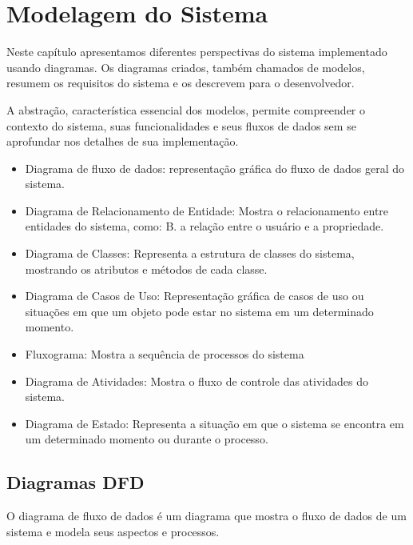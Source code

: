 
\chapter{Modelagem do Sistema}

Neste capítulo apresentamos diferentes perspectivas do sistema implementado usando diagramas. Os diagramas criados, também chamados de modelos, resumem os requisitos do sistema e os descrevem para o desenvolvedor.

A abstração, característica essencial dos modelos, permite compreender o contexto do sistema, suas funcionalidades e seus fluxos de dados sem se aprofundar nos detalhes de sua implementação.


\begin{itemize}
  \item Diagrama de fluxo de dados: representação gráfica do fluxo de dados geral do sistema.
  \item Diagrama de Relacionamento de Entidade: Mostra o relacionamento entre entidades do sistema, como: B. a relação entre o usuário e a propriedade.
  \item Diagrama de Classes: Representa a estrutura de classes do sistema, mostrando os atributos e métodos de cada classe.
  \item Diagrama de Casos de Uso: Representação gráfica de casos de uso ou situações em que um objeto pode estar no sistema em um determinado momento.
  \item Fluxograma: Mostra a sequência de processos do sistema
  \item Diagrama de Atividades: Mostra o fluxo de controle das atividades do sistema.
  \item Diagrama de Estado: Representa a situação em que o sistema se encontra em um determinado momento ou durante o processo.


\end{itemize}



\section{Diagramas DFD}
O diagrama de fluxo de dados é um diagrama que mostra o fluxo de dados de um sistema e modela seus aspectos e processos.

